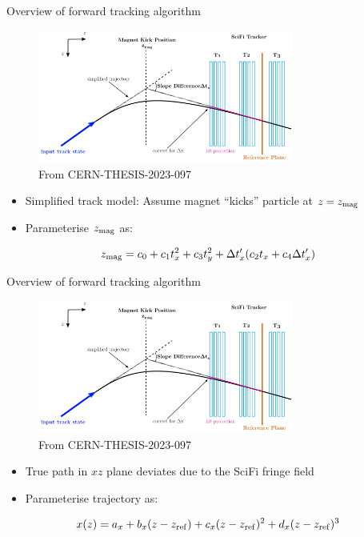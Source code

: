 \documentclass[xcolor={dvipsnames}]{beamer}
\begin{document}
\begin{frame}{Overview of forward tracking algorithm}
  \vspace{0.0cm}
  \begin{figure}[htb]
    \centering
    \includegraphics[width=0.75\textwidth]{Plots/MagnetKinkPosition.png}
    \caption*{\small From CERN-THESIS-2023-097}
  \end{figure}
  \begin{itemize}
    \item{Simplified track model: Assume magnet ``kicks'' particle at $z = z_{\rm mag}$}
    \item{Parameterise $z_{\rm mag}$ as:}
  \end{itemize}
  \begin{equation*}
    z_{\rm mag} = c_0 + c_1t_x^2 + c_3t_y^2 + \Delta t_x^\prime(c_2t_x + c_4\Delta t_x^\prime)
  \end{equation*}
\end{frame}

\begin{frame}{Overview of forward tracking algorithm}
  \vspace{0.0cm}
  \begin{figure}[htb]
    \centering
    \includegraphics[width=0.75\textwidth]{Plots/MagnetKinkPosition.png}
    \caption*{\small From CERN-THESIS-2023-097}
  \end{figure}
  \begin{itemize}
    \item{True path in $xz$ plane deviates due to the SciFi fringe field}
    \item{Parameterise trajectory as:}
  \end{itemize}
  \begin{equation*}
    x(z) = a_x + b_x(z - z_{\rm ref}) + c_x(z - z_{\rm ref})^2 + d_x(z - z_{\rm ref})^3
  \end{equation*}
\end{frame}
\end{document}
